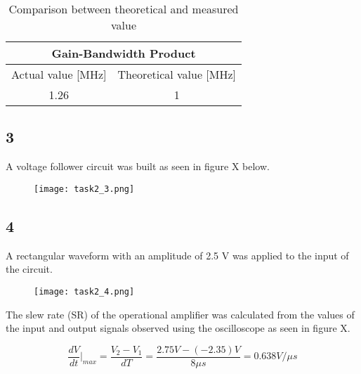    \begin{table}[htbp]
     \centering
     \caption{Comparison between theoretical and measured value}
       \begin{tabular}{c|c}
        \multicolumn{2}{c}{Gain-Bandwidth Product}\\
        \hline
        Actual value [MHz] & Theoretical value [MHz] \\
       \hline
        1.26          & 1 \\
       \end{tabular}%
     \label{tab:addlabel}%
   \end{table}%

\subsection*{3}

    A voltage follower circuit was built as seen in figure X below.\\
    
    \begin{figure}[h!]
        \centering
        \texttt{[image: task2\_3.png]}
    \end{figure}


\subsection*{4}

    A rectangular waveform with an amplitude of 2.5 V was applied to the input of the circuit.\\

    \begin{figure}[h!]
        \centering
        \texttt{[image: task2\_4.png]}
    \end{figure}

    The slew rate (SR) of the operational amplifier was calculated from the values of the input and output signals observed using the oscilloscope as seen in figure X.

    $$\dfrac{dV}{dt} \vert _{max} = \frac{V_2-V_1}{dT} = \frac{2.75V-(-2.35) V}{8\mu s} = 0.638 V/\mu s$$

